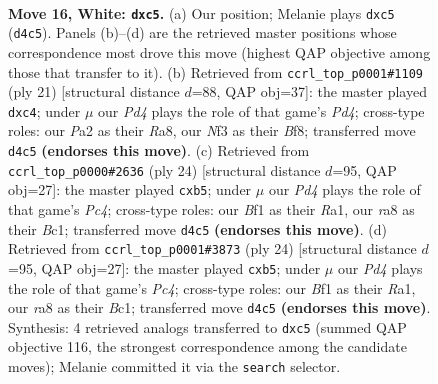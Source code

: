 \documentclass[11pt]{article}
\begin{document}
\clearpage

\begin{figure}[p]\centering
\begin{subfigure}{0.46\textwidth}\centering
\resizebox{\linewidth}{!}{%
\newchessgame
\chessboard[
  setfen={r1b2r2/p1ppqp2/2n1pn1k/1Qp3pp/3P4/2B2NP1/PP1KPP1P/R4B1R w - - 0 16},
  showmover=false,
  pgfstyle=straightmove, color=movearrow, markmove={d4-c5}
]}
\caption{}
\end{subfigure}\hfill
\begin{subfigure}{0.46\textwidth}\centering
\resizebox{\linewidth}{!}{%
\newchessgame
\chessboard[
  setfen={r1b1kb1r/pp1n1ppp/2n1p3/q2pP3/B1P5/2P2N1P/P2P1PP1/RNBQ1RK1 b kq - 0 11},
  showmover=false,
  pgfstyle=straightmove, color=movearrow, markmove={d5-c4}
]}
\caption{}
\end{subfigure}
\\[4pt]
\begin{subfigure}{0.46\textwidth}\centering
\resizebox{\linewidth}{!}{%
\newchessgame
\chessboard[
  setfen={r1b1nrk1/p2pqppp/4p3/1p4P1/nPP5/P4N2/2Q1PP1P/R1B1KB1R w KQ - 1 13},
  showmover=false,
  pgfstyle=straightmove, color=movearrow, markmove={c4-b5}
]}
\caption{}
\end{subfigure}\hfill
\begin{subfigure}{0.46\textwidth}\centering
\resizebox{\linewidth}{!}{%
\newchessgame
\chessboard[
  setfen={r1b1nrk1/p2pqppp/4p3/1p4P1/nPP5/P4N2/2Q1PP1P/R1B1KB1R w KQ - 1 13},
  showmover=false,
  pgfstyle=straightmove, color=movearrow, markmove={c4-b5}
]}
\caption{}
\end{subfigure}
\caption{\textbf{Move 16, White: \texttt{dxc5}.} (a) Our position; Melanie plays \texttt{dxc5} (\texttt{d4c5}). Panels (b)--(d) are the retrieved master positions whose correspondence most drove this move (highest QAP objective among those that transfer to it). (b) Retrieved from \texttt{ccrl\_top\_p0001\#1109} (ply 21) [structural distance $d$=88, QAP obj=37]: the master played \texttt{dxc4}; under $\mu$ our \emph{Pd4} plays the role of that game's \emph{Pd4}; cross-type roles: our \emph{P}a2 as their \emph{R}a8, our \emph{N}f3 as their \emph{B}f8; transferred move \texttt{d4c5} \textbf{(endorses this move)}. (c) Retrieved from \texttt{ccrl\_top\_p0000\#2636} (ply 24) [structural distance $d$=95, QAP obj=27]: the master played \texttt{cxb5}; under $\mu$ our \emph{Pd4} plays the role of that game's \emph{Pc4}; cross-type roles: our \emph{B}f1 as their \emph{R}a1, our \emph{r}a8 as their \emph{B}c1; transferred move \texttt{d4c5} \textbf{(endorses this move)}. (d) Retrieved from \texttt{ccrl\_top\_p0001\#3873} (ply 24) [structural distance $d$=95, QAP obj=27]: the master played \texttt{cxb5}; under $\mu$ our \emph{Pd4} plays the role of that game's \emph{Pc4}; cross-type roles: our \emph{B}f1 as their \emph{R}a1, our \emph{r}a8 as their \emph{B}c1; transferred move \texttt{d4c5} \textbf{(endorses this move)}. Synthesis: 4 retrieved analogs transferred to \texttt{dxc5} (summed QAP objective 116, the strongest correspondence among the candidate moves); Melanie committed it via the \texttt{search} selector.}
\label{fig:thought-m30}
\end{figure}
\end{document}
